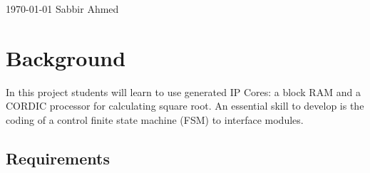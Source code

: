 \documentclass[paper=usletter, fontsize=12pt]{article}
\begin{document}
    {\today} {Sabbir Ahmed}
    \vspace{-0.1in}

    \section{Background} In this project students will learn to use generated
    IP Cores: a block RAM and a CORDIC processor for calculating square root.
    An essential skill to develop is the coding of a control finite state
    machine (FSM) to interface modules.

        \subsection{Requirements}
\end{document}
